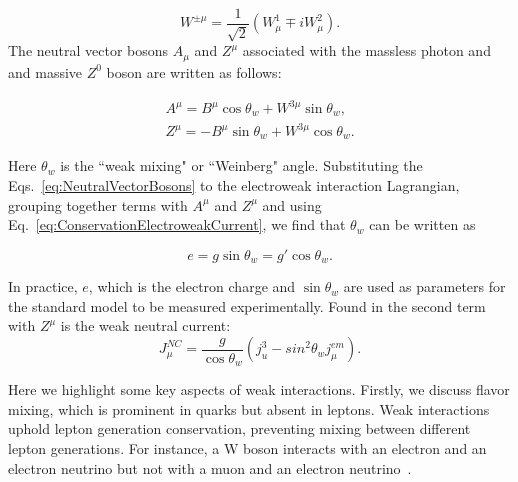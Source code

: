 \begin{equation} 
\label{eq:MassiveVecBoson}
W^{\pm\mu} = \frac{1}{\sqrt{2}}(W^{1}_{\mu} \mp iW^{2}_{\mu}).
\end{equation}
The neutral vector bosons $A_{\mu}$ and $Z^{\mu}$ associated with the massless photon and and massive $Z^{0}$ boson are written as follows:

\begin{equation} 
\label{eq:NeutralVectorBosons}
\begin{align*} 
A^{\mu} = B^{\mu}\cos\theta_{w} + W^{3\mu} \sin\theta_{w} ,\\ 
Z^{\mu} = -B^{\mu}\sin\theta_{w} + W^{3\mu} \cos\theta_{w}.
\end{align*}
\end{equation}

Here $\theta_w$ is the ``weak mixing" or ``Weinberg" angle. Substituting the Eqs.~\ref{eq:NeutralVectorBosons} to the electroweak interaction Lagrangian, grouping together terms with $A^{\mu}$ and $Z^{\mu}$\cite{Halzen:1984mc} and using Eq.~\ref{eq:ConservationElectroweakCurrent}, we find that $\theta_w$ can be written as 

\begin{equation} 
\label{eq:weinbergAngle}
e = g\sin\theta_{w} = g'\cos\theta_{w}.
\end{equation}

In practice, $e$, which is the electron charge and $\sin\theta_{w}$ are used as parameters for the standard model to be measured experimentally. Found in the second term with $Z^{\mu}$ is the weak neutral current:
\begin{equation} 
\label{eq:neutralcurrent}
J^{NC}_{\mu} = \frac{g}{\cos\theta_{w}} (j^3_{u} - sin^2\theta_w j^{em}_{\mu}).
\end{equation}


Here we highlight some key aspects of weak interactions. Firstly, we discuss flavor mixing, which is prominent in quarks but absent in leptons. Weak interactions uphold lepton generation conservation, preventing mixing between different lepton generations. For instance, a W boson interacts with an electron and an electron neutrino but not with a muon and an electron neutrino~\cite{MarkusKluteLectures}. 



